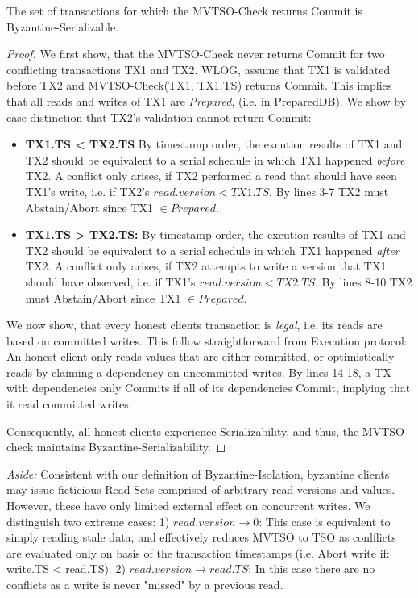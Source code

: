\begin{theorem}
The set of transactions for which the MVTSO-Check returns Commit is Byzantine-Serializable. 
\end{theorem}
\begin{proof}
We first show, that the MVTSO-Check never returns Commit for two conflicting transactions TX1 and TX2.
WLOG, assume that TX1 is validated before TX2 and MVTSO-Check(TX1, TX1.TS) returns Commit. This implies that all reads and writes of TX1 are \textit{Prepared}, (i.e. in PreparedDB).
We show by case distinction that TX2's validation cannot return Commit:
\begin{itemize}

\item \textbf{TX1.TS < TX2.TS} By timestamp order, the excution results of TX1 and TX2 should be equivalent to a serial schedule in which TX1 happened \textit{before} TX2. A conflict only arises, if TX2 performed a read that should have seen TX1's write, i.e. if TX2's $read.version < TX1.TS$. By lines 3-7 TX2 must Abstain/Abort since TX1 $\in Prepared$. 

\item \textbf{TX1.TS > TX2.TS:} By timestamp order, the excution results of TX1 and TX2 should be equivalent to a serial schedule in which TX1 happened \textit{after} TX2. A conflict only arises, if TX2 attempts to write a version that TX1 should have observed, i.e. if TX1's $read.version < TX2.TS$. By lines 8-10 TX2 must Abstain/Abort since TX1 $\in Prepared$. 
\end{itemize}

We now show, that every honest clients transaction is \textit{legal}, i.e. its reads are based on committed writes. This follow straightforward from Execution protocol: An honest client only reads values that are either committed, or optimistically reads by claiming a dependency on uncommitted writes. By lines 14-18, a TX with dependencies only Commits if all of its dependencies Commit, implying that it read committed writes.

Consequently, all honest clients experience Serializability, and thus, the MVTSO-check maintains Byzantine-Serializability.
\end{proof}

\textit{Aside:} Consistent with our definition of Byzantine-Isolation, byzantine clients may issue ficticious Read-Sets comprised of arbitrary read versions and values. However, these have only limited external effect on concurrent writes. We distinguish two extreme cases: 1) $read.version \rightarrow 0$: This case is equivalent to simply reading stale data, and effectively reduces MVTSO to TSO as conlflicts are evaluated only on basis of the transaction timestamps (i.e. Abort write if: write.TS < read.TS). 2) $read.version \rightarrow read.TS$: In this case there are no conflicts as a write is never "missed" by a previous read.

